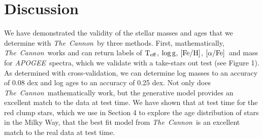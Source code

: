 \documentclass[12pt, preprint]{aastex}
\newcommand{\project}[1]{\textsl{#1}}
\newcommand{\tc}{\project{The~Cannon}}
\newcommand{\apogee}{\project{APOGEE}}
\newcommand{\teff}{\mbox{$\rm T_{eff}$}}
\newcommand{\feh}{\mbox{$\rm [Fe/H]$}}
\newcommand{\alphafe}{\mbox{$\rm [\alpha/Fe]$}}
\newcommand{\logg}{\mbox{$\rm \log g$}}
\begin{document}

 





\section{Discussion}

We have demonstrated the validity of the stellar masses and ages that we determine with \tc\ by three methods. First, mathematically, \tc\ works and can return labels of \teff, \logg, \feh, \alphafe\ and mass for \apogee\ spectra, which we validate with a take-stars out test (see Figure 1). As determined with cross-validation, we can determine log masses to an accuracy of 0.08 dex and log ages to an accuracy of 0.25 dex. Not only does \tc\ mathematically work, but the generative model provides an excellent match to the data at test time. We have shown that at test time for the red clump stars, which we use in Section 4 to explore the age distribution of stars in the Milky Way, that the best fit model from \tc\ is an excellent match to the real data at test time. 
\end{document}
